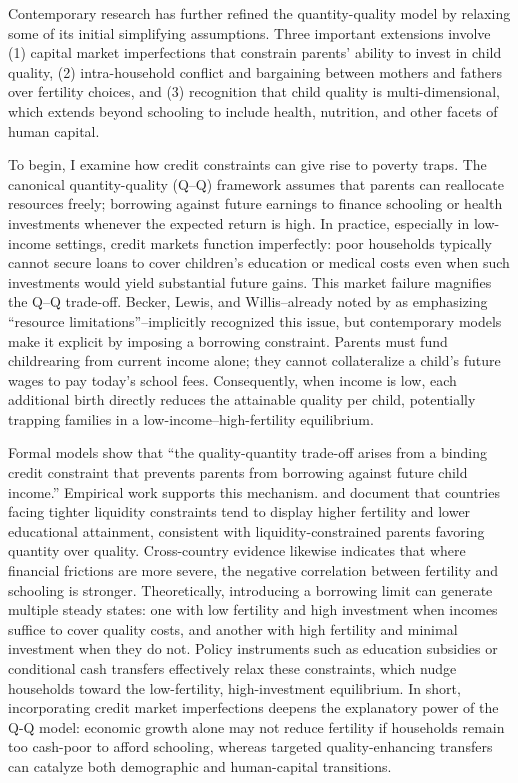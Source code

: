 \documentclass[]{AEA}
\begin{document}
Contemporary research has further refined the quantity-quality model by
relaxing some of its initial simplifying assumptions. Three important
extensions involve (1) capital market imperfections that constrain
parents' ability to invest in child quality, (2) intra-household
conflict and bargaining between mothers and fathers over fertility
choices, and (3) recognition that child quality is multi-dimensional,
which extends beyond schooling to include health, nutrition, and other
facets of human capital.

To begin, I examine how credit constraints can give rise to poverty
traps. The canonical quantity-quality (Q--Q) framework assumes that
parents can reallocate resources freely; borrowing against future
earnings to finance schooling or health investments whenever the
expected return is high. In practice, especially in low-income settings,
credit markets function imperfectly: poor households typically cannot
secure loans to cover children's education or medical costs even when
such investments would yield substantial future gains. This market
failure magnifies the Q--Q trade-off. Becker, Lewis, and Willis--already
noted by \citet{grawe2008quality} as emphasizing ``resource
limitations''--implicitly recognized this issue, but contemporary models
make it explicit by imposing a borrowing constraint. Parents must fund
childrearing from current income alone; they cannot collateralize a
child's future wages to pay today's school fees. Consequently, when
income is low, each additional birth directly reduces the attainable
quality per child, potentially trapping families in a
low-income--high-fertility equilibrium.

Formal models show that ``the quality-quantity trade-off arises from a
binding credit constraint that prevents parents from borrowing against
future child income.'' Empirical work supports this mechanism.
\citet{kremer2002income} and \citet{de2003inequality} document that
countries facing tighter liquidity constraints tend to display higher
fertility and lower educational attainment, consistent with
liquidity-constrained parents favoring quantity over quality.
Cross-country evidence likewise indicates that where financial frictions
are more severe, the negative correlation between fertility and
schooling is stronger. Theoretically, introducing a borrowing limit can
generate multiple steady states: one with low fertility and high
investment when incomes suffice to cover quality costs, and another with
high fertility and minimal investment when they do not. Policy
instruments such as education subsidies or conditional cash transfers
effectively relax these constraints, which nudge households toward the
low-fertility, high-investment equilibrium. In short, incorporating
credit market imperfections deepens the explanatory power of the Q-Q
model: economic growth alone may not reduce fertility if households
remain too cash-poor to afford schooling, whereas targeted
quality-enhancing transfers can catalyze both demographic and
human-capital transitions.
\end{document}
